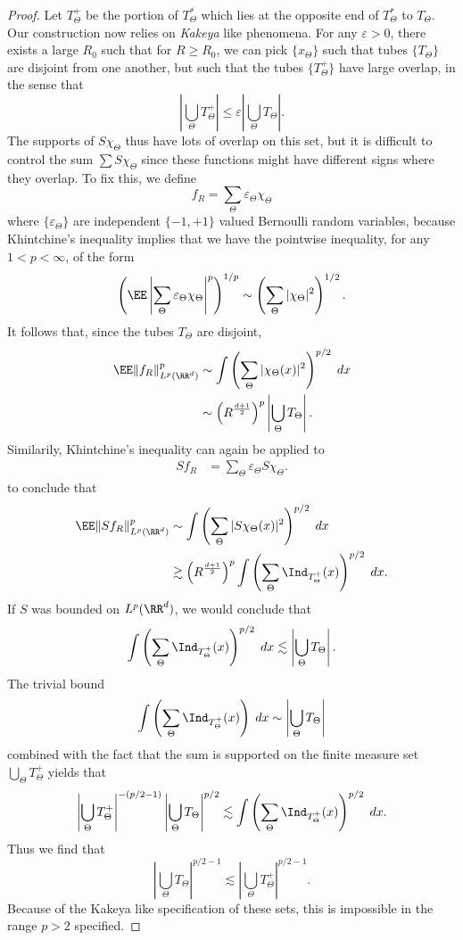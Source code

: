 \begin{proof}
    Let $T_\Theta^+$ be the portion of $T_\Theta^*$ which lies at the opposite end of $T_\Theta^*$ to $T_\Theta$. Our construction now relies on \emph{Kakeya} like phenomena. For any $\varepsilon > 0$, there exists a large $R_0$ such that for $R \geq R_0$, we can pick $\{ x_\Theta \}$ such that tubes $\{ T_\Theta \}$ are disjoint from one another, but such that the tubes $\{ T_\Theta^+ \}$ have large overlap, in the sense that
    \[ | \bigcup_\Theta T_\Theta^+ | \leq \varepsilon | \bigcup_\Theta T_\Theta|. \]
    The supports of $S \chi_\Theta$ thus have lots of overlap on this set, but it is difficult to control the sum $\sum S \chi_\Theta$ since these functions might have different signs where they overlap. To fix this, we define
    \[ f_R = \sum_\Theta \varepsilon_\Theta \chi_\Theta \]
    where $\{ \varepsilon_\Theta \}$ are independent $\{ -1, +1 \}$ valued Bernoulli random variables, because Khintchine's inequality implies that we have the pointwise inequality, for any $1 < p < \infty$, of the form
    \[ \left( \EE \left| \sum_\Theta \varepsilon_\Theta \chi_\Theta \right|^p \right)^{1/p} \sim \left( \sum_\Theta |\chi_\Theta|^2 \right)^{1/2}. \]
    It follows that, since the tubes $T_\Theta$ are disjoint,
    \begin{align*}
        \EE \| f_R \|_{L^p(\RR^d)}^p &\sim \int \left( \sum_\Theta |\chi_\Theta(x)|^2 \right)^{p/2}\; dx\\
        &\sim \left( R^{\frac{d+1}{2}} \right)^p \left| \bigcup_\Theta T_\Theta \right|.
    \end{align*}
    Similarily, Khintchine's inequality can again be applied to
    \begin{align*}
        Sf_R &= \sum_\Theta \varepsilon_\Theta S \chi_\Theta.
    \end{align*}
    to conclude that
    \begin{align*}
        \EE \| Sf_R \|_{L^p(\RR^d)}^p &\sim \int \left( \sum_\Theta |S \chi_\Theta(x)|^2 \right)^{p/2}\; dx\\
        &\gtrsim \left( R^{\frac{d+1}{2}} \right)^p \int \left( \sum_\Theta \Ind_{T_\Theta^+}(x) \right)^{p/2}\; dx.
    \end{align*}
    If $S$ was bounded on $L^p(\RR^d)$, we would conclude that
    \[ \int \left( \sum_\Theta \Ind_{T_\Theta^+}(x) \right)^{p/2}\; dx \lesssim \left| \bigcup_\Theta T_\Theta \right|. \]
    The trivial bound
    \[ \int \left( \sum_\Theta \Ind_{T_\Theta^+}(x) \right)\; dx \sim \left| \bigcup_\Theta T_\Theta \right| \]
    combined with the fact that the sum is supported on the finite measure set $\bigcup_\Theta T_\Theta^+$ yields that
    \[ \left| \bigcup_\Theta T_\Theta^+ \right|^{-(p/2 - 1)} \left| \bigcup_\Theta T_\Theta \right|^{p/2} \lesssim \int \left( \sum_\Theta \Ind_{T_\Theta^+}(x) \right)^{p/2}\; dx. \]
    Thus we find that
    \[ \left| \bigcup_\Theta T_\Theta \right|^{p/2 - 1} \lesssim  \left| \bigcup_\Theta T_\Theta^+ \right|^{p/2 - 1}. \]
    Because of the Kakeya like specification of these sets, this is impossible in the range $p > 2$ specified.
\end{proof}

